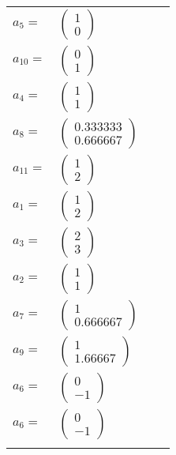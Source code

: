\documentclass[1p]{elsarticle_modified}
\theoremstyle{definition}
\begin{document}
\begin{tabular}{m{7pt} m{180pt} m{7pt} m{180pt} }
\flushright $a_{5}=$&$\begin{pmatrix}1\\0\end{pmatrix}$ \\
\flushright $a_{10}=$&$\begin{pmatrix}0\\1\end{pmatrix}$ \\
\flushright $a_{4}=$&$\begin{pmatrix}1\\1\end{pmatrix}$ \\
\flushright $a_{8}=$&$\begin{pmatrix}0.333333\\0.666667\end{pmatrix}$ \\
\flushright $a_{11}=$&$\begin{pmatrix}1\\2\end{pmatrix}$ \\
\flushright $a_{1}=$&$\begin{pmatrix}1\\2\end{pmatrix}$ \\
\flushright $a_{3}=$&$\begin{pmatrix}2\\3\end{pmatrix}$ \\
\flushright $a_{2}=$&$\begin{pmatrix}1\\1\end{pmatrix}$ \\
\flushright $a_{7}=$&$\begin{pmatrix}1\\0.666667\end{pmatrix}$ \\
\flushright $a_{9}=$&$\begin{pmatrix}1\\1.66667\end{pmatrix}$ \\
\flushright $a_{6}=$&$\begin{pmatrix}0\\-1\end{pmatrix}$\\ \flushright $a_{6}=$&$\begin{pmatrix}0\\-1\end{pmatrix}$\\&\end{tabular}
\end{document}

